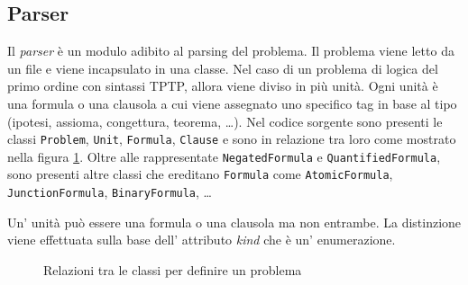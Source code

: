 \subsection{Parser}
Il \emph{parser} è un modulo adibito al parsing del problema. Il problema viene letto da un file e viene incapsulato in una classe.
Nel caso di un problema di logica del primo ordine con sintassi TPTP, allora viene diviso in più unità.
Ogni unità è una formula o una clausola a cui viene assegnato uno specifico tag in base al tipo (ipotesi, assioma, congettura, teorema, \dots).
Nel codice sorgente sono presenti le classi \verb|Problem|, \verb|Unit|, \verb|Formula|, \verb|Clause| e sono in relazione tra loro come mostrato nella figura \ref{fig:relazioni-classi}.
Oltre alle rappresentate \verb|NegatedFormula| e \verb|QuantifiedFormula|, sono presenti altre classi che ereditano \verb|Formula| come
\verb|AtomicFormula|, \verb|JunctionFormula|, \verb|BinaryFormula|, \dots
\begin{remark}
    Un' unità può essere una formula o una clausola ma non entrambe. La distinzione viene effettuata sulla base dell'
    attributo \emph{kind} che è un' enumerazione.
\end{remark}
\vspace{.3cm}
\begin{figure}[H]
    \caption{Relazioni tra le classi per definire un problema}
    \label{fig:relazioni-classi}
\end{figure}

